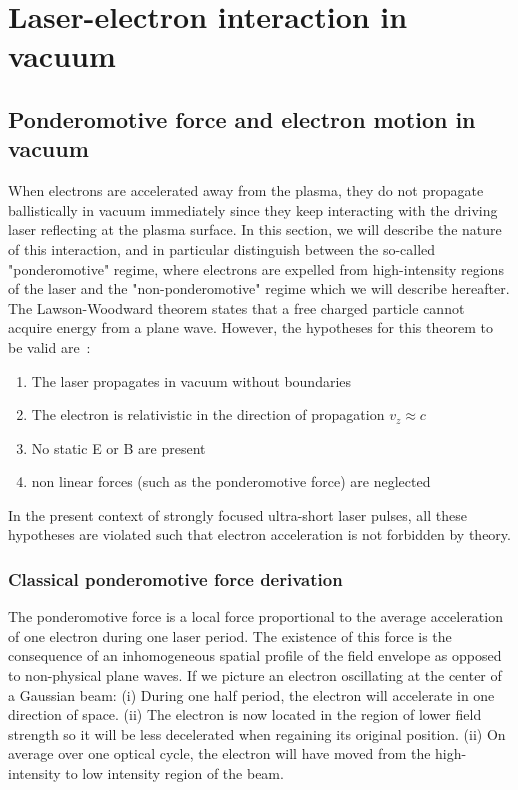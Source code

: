 \chapter{Laser-electron interaction in vacuum}
\label{Laser-electron interaction in vacumm}
\minitoc

\dominitoc

\minitoc

\thispagestyle{empty}

\section{Ponderomotive force and electron motion in vacuum}\label{section:Ponderomotive force and electron motion in vacuum}


When electrons are accelerated away from the plasma, they do not propagate ballistically in vacuum immediately since they keep interacting with the driving laser reflecting at the plasma surface. In this section, we will describe the nature of this interaction, and in particular distinguish between the so-called "ponderomotive" regime, where electrons are expelled from high-intensity regions of the laser and the "non-ponderomotive" regime which we will describe hereafter. The Lawson-Woodward theorem states that a free charged particle cannot acquire energy from a plane wave. However, the hypotheses for this theorem to be valid are~\cite{LWtheoremLS}:
\begin{enumerate}
\item The laser propagates in vacuum without boundaries
\item The electron is relativistic in the direction of propagation $v_z\approx c$
\item No static E or B are present
\item non linear forces (such as the ponderomotive force) are neglected
\end{enumerate}
In the present context of strongly focused ultra-short laser pulses, all these hypotheses are violated such that electron acceleration is not forbidden by theory.

\subsection{Classical ponderomotive force derivation}

The ponderomotive force is a local force proportional to the average acceleration of one electron during one laser period. The existence of this force is the consequence of an inhomogeneous spatial profile of the field envelope as opposed to non-physical plane waves. If we picture an electron oscillating at the center of a Gaussian beam: (i) During one half period, the electron will accelerate in one direction of space. (ii) The electron is now located in the region of lower field strength so it will be less decelerated when regaining its original position. (ii) On average over one optical cycle, the electron will have moved from the high-intensity to  low intensity region of the beam. \\



